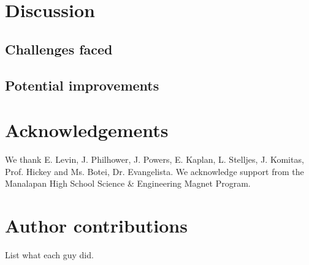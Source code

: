 \documentclass[Preprint,10pt]{ascelike}
\begin{document}
\section{Discussion}
\subsection{Challenges faced}
\subsection{Potential improvements}

\section{Acknowledgements}
We thank E. Levin, J. Philhower, J. Powers, E. Kaplan, L. Stelljes, J. Komitas, Prof. Hickey and Ms.
Botei, Dr. Evangelista. We acknowledge support from the Manalapan High School Science \& Engineering Magnet Program.

\section{Author contributions}
List what each guy did. 

%
\printbibliography
%
%
%
\end{document}
